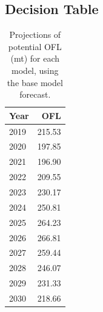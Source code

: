 \documentclass[12pt,]{article}
\begin{document}
\FloatBarrier

\subsection*{Decision Table}\label{decision-table}

\begin{table}[ht]
\centering
\caption{Projections of potential OFL (mt) for 
                                        each model, using the base model forecast.} 
\label{tab:OFL_projection}
\begin{tabular}{lr}
  \hline
Year & OFL \\ 
  \hline
2019 & 215.53 \\ 
  2020 & 197.85 \\ 
  2021 & 196.90 \\ 
  2022 & 209.55 \\ 
  2023 & 230.17 \\ 
  2024 & 250.81 \\ 
  2025 & 264.23 \\ 
  2026 & 266.81 \\ 
  2027 & 259.44 \\ 
  2028 & 246.07 \\ 
  2029 & 231.33 \\ 
  2030 & 218.66 \\ 
   \hline
\end{tabular}
\end{table}\begin{table}[ht]
\centering
\caption{Summary of 10-year 
                                             projections beginning in 2020 
                                             for alternate states of nature based on 
                                             an axis of uncertainty for the model.  Columns range over low, mid, and high
                                             states of nature, and rows range over different 
                                             assumptions of catch levels. An entry of "--" 
                                             indicates that the stock is driven to very low 
                                             abundance under the particular scenario.} 
\label{tab:Decision_table_mod1}
\end{table}
\end{document}
